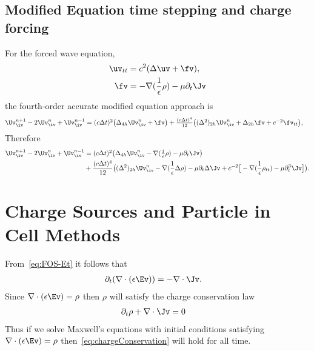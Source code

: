 \documentclass[12pt]{article}
\newcommand{\grad}{\nabla}
\begin{document}
\subsection{Modified Equation time stepping and charge forcing}


For the forced wave equation,
\begin{align*}
 \uv_{tt} &= c^2 ( \Delta \uv + \fv ), \\
  \fv &= -\grad(\frac{1}{\epsilon}\rho)- \mu \partial_t\Jv 
\end{align*}
the fourth-order accurate modified equation approach is
\begin{align*}
  \Uv_\iv^{n+1} -2 \Uv_\iv ^n + \Uv_\iv^{n-1} &=
    \textstyle (c\dt)^2 \big( \Delta_{4h} \Uv_\iv^n + \fv \big) %
          + {(c\dt)^4\over 12} \big( (\Delta^2)_{2h} \Uv_\iv^n + \Delta_{2h} \fv  + c^{-2}\fv_{tt} \big),
\end{align*}
Therefore
\begin{align*}
  \Uv_\iv^{n+1} -2 \Uv_\iv ^n + \Uv_\iv^{n-1} &=
    \textstyle (c\dt)^2 \big( \Delta_{4h} \Uv_\iv^n 
                -\grad(\frac{1}{\epsilon}\rho)- \mu \partial_t\Jv \big) \\
    & + {(c\dt)^4\over 12} \big( (\Delta^2)_{2h} \Uv_\iv^n 
          -\grad(\frac{1}{\epsilon} \Delta\rho)- \mu \partial_t \Delta\Jv 
           + c^{-2}\big[ -\grad(\frac{1}{\epsilon}\rho_{tt})- \mu \partial_t^3\Jv \big] \big).
\end{align*}



\section{Charge Sources and Particle in Cell Methods}

From~\eqref{eq:FOS-Et} it follows that
\begin{align}
  \partial_t(\grad\cdot(\eps\Ev)) &=   - \grad\cdot\Jv .
\end{align}
Since $\grad\cdot(\eps\Ev)=\rho$ then $\rho$  will satisfy the charge conservation law
\begin{align}
  \partial_t\rho + \grad\cdot\Jv &=0 \label{eq:chargeConservation}
\end{align}
Thus if we solve Maxwell's equations with initial conditions satisfying $\grad\cdot(\eps\Ev)=\rho$
then~\eqref{eq:chargeConservation} will hold for all time.
\end{document}
